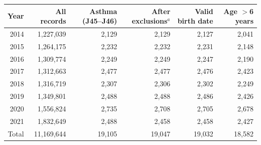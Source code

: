\begin{tabular}{rrrrrr}
\toprule
Year & All records & Asthma (J45--J46) & After exclusions$^{a}$ & Valid birth date & Age $>$6 years \\
\midrule
2014 & 1,227,039 & 2,129 & 2,129 & 2,127 & 2,041 \\
2015 & 1,264,175 & 2,232 & 2,232 & 2,231 & 2,148 \\
2016 & 1,309,774 & 2,249 & 2,249 & 2,247 & 2,190 \\
2017 & 1,312,663 & 2,477 & 2,477 & 2,476 & 2,423 \\
2018 & 1,316,719 & 2,307 & 2,306 & 2,302 & 2,249 \\
2019 & 1,349,801 & 2,488 & 2,488 & 2,486 & 2,426 \\
2020 & 1,556,824 & 2,735 & 2,708 & 2,705 & 2,678 \\
2021 & 1,832,649 & 2,488 & 2,458 & 2,458 & 2,427 \\
\midrule
Total & 11,169,644 & 19,105 & 19,047 & 19,032 & 18,582 \\
\bottomrule
\end{tabular}
